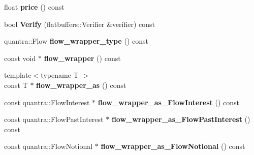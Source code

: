 \begin{DoxyCompactItemize}
\mbox{\label{structquantra_1_1FLATBUFFERS__FINAL__CLASS_afbd77034b48d3fee2f27dad0ac3503f1}} 
float {\bfseries price} () const
\item 
\mbox{\label{structquantra_1_1FLATBUFFERS__FINAL__CLASS_aed693ee5a45b5f53af7411f9cab6793a}} 
bool {\bfseries Verify} (flatbuffers\+::\+Verifier \&verifier) const
\item 
\mbox{\label{structquantra_1_1FLATBUFFERS__FINAL__CLASS_ab95fb8e9407c2bda1637c5e48996ca37}} 
quantra\+::\+Flow {\bfseries flow\+\_\+wrapper\+\_\+type} () const
\item 
\mbox{\label{structquantra_1_1FLATBUFFERS__FINAL__CLASS_a1dca41a62b72f409dbfd6d27ab43aad1}} 
const void $\ast$ {\bfseries flow\+\_\+wrapper} () const
\item 
\mbox{\label{structquantra_1_1FLATBUFFERS__FINAL__CLASS_a2225cfd4922352beac5604d8a00f46ef}} 
{\footnotesize template$<$typename T $>$ }\\const T $\ast$ {\bfseries flow\+\_\+wrapper\+\_\+as} () const
\item 
\mbox{\label{structquantra_1_1FLATBUFFERS__FINAL__CLASS_a90a09a81669c2966fc96de3c3e32757b}} 
const quantra\+::\+Flow\+Interest $\ast$ {\bfseries flow\+\_\+wrapper\+\_\+as\+\_\+\+Flow\+Interest} () const
\item 
\mbox{\label{structquantra_1_1FLATBUFFERS__FINAL__CLASS_a5abc9ea9cd01f6d33a1b75cd92e0cb09}} 
const quantra\+::\+Flow\+Past\+Interest $\ast$ {\bfseries flow\+\_\+wrapper\+\_\+as\+\_\+\+Flow\+Past\+Interest} () const
\item 
\mbox{\label{structquantra_1_1FLATBUFFERS__FINAL__CLASS_a2a1544e4ddf5c0ba47c8bc004f4963c3}} 
const quantra\+::\+Flow\+Notional $\ast$ {\bfseries flow\+\_\+wrapper\+\_\+as\+\_\+\+Flow\+Notional} () const
\item 
\mbox{\label{structquantra_1_1FLATBUFFERS__FINAL__CLASS_aed693ee5a45b5f53af7411f9cab6793a}} 

\end{DoxyCompactItemize}
